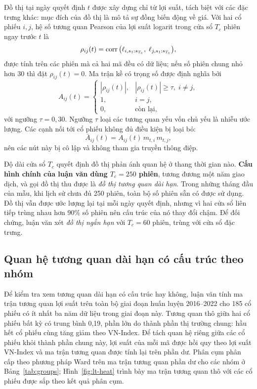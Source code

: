 Đồ thị tại ngày quyết định $t$ được xây dựng chỉ từ lợi suất, tách biệt với các đặc trưng khác: mục đích của đồ thị là mô tả sự đồng biến động về giá. Với hai cổ phiếu $i,j$, hệ số tương quan Pearson của lợi suất logarit trong cửa sổ $T_c$ phiên ngay trước $t$ là
\begin{equation}
\rho_{ij}(t)=\operatorname{corr}\big(\ell_{i,s_1:s_{T_c}},\;\ell_{j,s_1:s_{T_c}}\big),
\label{eq:corr}
\end{equation}
được tính trên các phiên mà cả hai mã đều có dữ liệu; nếu số phiên chung nhỏ hơn 30 thì đặt $\rho_{ij}(t)=0$. Ma trận kề có trọng số được định nghĩa bởi
\begin{equation}
A_{ij}(t)=
\begin{cases}
|\rho_{ij}(t)|, & |\rho_{ij}(t)|\ge\tau,\; i\ne j,\\
1, & i=j,\\
0, & \text{còn lại,}
\end{cases}
\label{eq:adj}
\end{equation}
với ngưỡng $\tau=0{,}30$. Ngưỡng $\tau$ loại các tương quan yếu vốn chủ yếu là nhiễu ước lượng. Các cạnh nối tới cổ phiếu không đủ điều kiện bị loại bỏ:
\begin{equation}
\bar A_{ij}(t)=A_{ij}(t)\,m_{t,i}\,m_{t,j},
\label{eq:maskadj}
\end{equation}
nên các nút này bị cô lập và không tham gia truyền thông điệp.

Độ dài cửa sổ $T_c$ quyết định đồ thị phản ánh quan hệ ở thang thời gian nào. \textbf{Cấu hình chính của luận văn dùng $T_c=250$ phiên}, tương đương một năm giao dịch, và gọi đồ thị thu được là \emph{đồ thị tương quan dài hạn}. Trong những tháng đầu của mẫu, khi lịch sử chưa đủ 250 phiên, toàn bộ số phiên sẵn có được sử dụng. Đồ thị vẫn được ước lượng lại tại mỗi ngày quyết định, nhưng vì hai cửa sổ liên tiếp trùng nhau hơn 90\% số phiên nên cấu trúc của nó thay đổi chậm. Để đối chứng, luận văn xét \emph{đồ thị ngắn hạn} với $T_c=60$ phiên, trùng với cửa sổ đặc trưng.

\subsection{Quan hệ tương quan dài hạn có cấu trúc theo nhóm}
\label{sec:groups}

Để kiểm tra xem tương quan dài hạn có cấu trúc hay không, luận văn tính ma trận tương quan lợi suất trên toàn bộ giai đoạn huấn luyện 2016--2022 cho 185 cổ phiếu có ít nhất ba năm dữ liệu trong giai đoạn này. Tương quan thô giữa hai cổ phiếu bất kỳ có trung bình 0,19, phần lớn do thành phần thị trường chung: hầu hết cổ phiếu cùng tăng giảm theo VN-Index. Để tách quan hệ riêng giữa các cổ phiếu khỏi thành phần chung này, lợi suất của mỗi mã được hồi quy theo lợi suất VN-Index và ma trận tương quan được tính lại trên phần dư. Phân cụm phân cấp theo phương pháp Ward trên ma trận tương quan phần dư cho các nhóm ở Bảng~\ref{tab:groups}; Hình~\ref{fig:lt-heat} trình bày ma trận tương quan thô với các cổ phiếu được sắp theo kết quả phân cụm.


